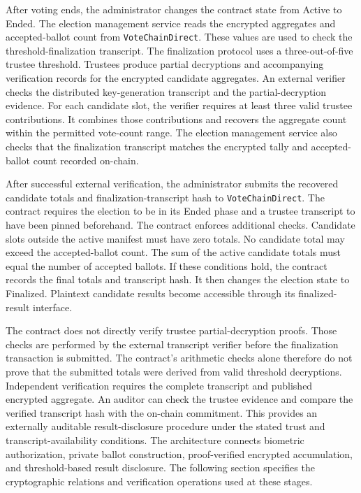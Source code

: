 After voting ends, the administrator changes the contract state from Active
to Ended. The election management service reads the encrypted aggregates and
accepted-ballot count from \texttt{VoteChainDirect}. These values are used
to check the threshold-finalization transcript.
The finalization protocol uses a three-out-of-five trustee threshold.
Trustees produce partial decryptions and accompanying verification records
for the encrypted candidate aggregates. An external verifier checks the
distributed key-generation transcript and the partial-decryption evidence.
For each candidate slot, the verifier requires at least three valid trustee
contributions. It combines those contributions and recovers the aggregate
count within the permitted vote-count range. The election management service
also checks that the finalization transcript matches the encrypted tally and
accepted-ballot count recorded on-chain.

After successful external verification, the administrator submits the
recovered candidate totals and finalization-transcript hash to
\texttt{VoteChainDirect}. The contract requires the election to be in its
Ended phase and a trustee transcript to have been pinned beforehand.
The contract enforces additional checks. Candidate slots outside the active
manifest must have zero totals. No candidate total may exceed the
accepted-ballot count. The sum of the active candidate totals must equal the
number of accepted ballots.
If these conditions hold, the contract records the final totals and
transcript hash. It then changes the election state to Finalized. Plaintext
candidate results become accessible through its finalized-result interface.

The contract does not directly verify trustee partial-decryption proofs.
Those checks are performed by the external transcript verifier before the
finalization transaction is submitted. The contract's arithmetic checks
alone therefore do not prove that the submitted totals were derived from
valid threshold decryptions.
Independent verification requires the complete transcript and published
encrypted aggregate. An auditor can check the trustee evidence and compare
the verified transcript hash with the on-chain commitment. This provides an
externally auditable result-disclosure procedure under the stated trust and
transcript-availability conditions.
The architecture connects biometric authorization, private ballot
construction, proof-verified encrypted accumulation, and threshold-based
result disclosure. The following section specifies the cryptographic
relations and verification operations used at these stages.


